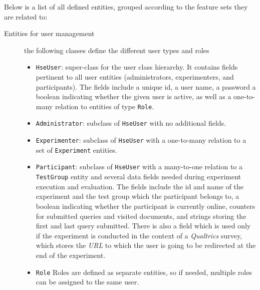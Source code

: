 \documentclass[a4paper]{usiinfbachelorproject}
\begin{document}
Below is a list of all defined entities, grouped according to the feature sets they are related to:

    \begin{description}

        \item[Entities for user management] the following classes define the different user types and roles 

            \begin{itemize}

                \item \texttt{HseUser}: super-class for the user class hierarchy. It contains fields pertinent to all
                    user entities (administrators, experimenters, and participants). The fields include a unique id, a user name, a password
                    a boolean indicating whether the given user is active, as well as a one-to-many relation to entities
                    of type \texttt{Role}.

                \item \texttt{Administrator}: subclass of \texttt{HseUser} with no additional fields.

                \item \texttt{Experimenter}: subclass of \texttt{HseUser} with a one-to-many relation to a set of \texttt{Experiment} entities.

                \item \texttt{Participant}: subclass of \texttt{HseUser} with a many-to-one relation to a \texttt{TestGroup} entity and
                    several data fields needed during experiment execution and evaluation. The fields include the id and name of the experiment
                    and the test group which the participant belongs to, a boolean indicating whether the participant is currently online,
                    counters for submitted queries and visited documents, and strings storing the first and last query submitted. There
                    is also a field which is used only if the experiment is conducted in the context of a \emph{Qualtrics} survey,
                    which stores the \emph{URL} to which the user is going to be redirected at the end of the experiment.

                \item \texttt{Role} Roles are defined as separate entities, so if needed, multiple roles can be assigned to the same user.

            \end{itemize}


\end{description}
\end{document}
